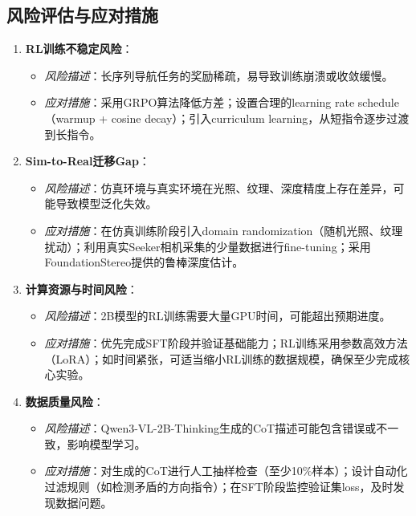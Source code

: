 \subsection{风险评估与应对措施}
\begin{enumerate}
    \item \textbf{RL训练不稳定风险}：
    \begin{itemize}
        \item \textit{风险描述}：长序列导航任务的奖励稀疏，易导致训练崩溃或收敛缓慢。
        \item \textit{应对措施}：采用GRPO算法降低方差；设置合理的learning rate schedule（warmup + cosine decay）；引入curriculum learning，从短指令逐步过渡到长指令。
    \end{itemize}
    \item \textbf{Sim-to-Real迁移Gap}：
    \begin{itemize}
        \item \textit{风险描述}：仿真环境与真实环境在光照、纹理、深度精度上存在差异，可能导致模型泛化失效。
        \item \textit{应对措施}：在仿真训练阶段引入domain randomization（随机光照、纹理扰动）；利用真实Seeker相机采集的少量数据进行fine-tuning；采用FoundationStereo提供的鲁棒深度估计。
    \end{itemize}
    \item \textbf{计算资源与时间风险}：
    \begin{itemize}
        \item \textit{风险描述}：2B模型的RL训练需要大量GPU时间，可能超出预期进度。
        \item \textit{应对措施}：优先完成SFT阶段并验证基础能力；RL训练采用参数高效方法（LoRA）；如时间紧张，可适当缩小RL训练的数据规模，确保至少完成核心实验。
    \end{itemize}
    \item \textbf{数据质量风险}：
    \begin{itemize}
        \item \textit{风险描述}：Qwen3-VL-2B-Thinking生成的CoT描述可能包含错误或不一致，影响模型学习。
        \item \textit{应对措施}：对生成的CoT进行人工抽样检查（至少10\%样本）；设计自动化过滤规则（如检测矛盾的方向指令）；在SFT阶段监控验证集loss，及时发现数据问题。
    \end{itemize}
\end{enumerate}
